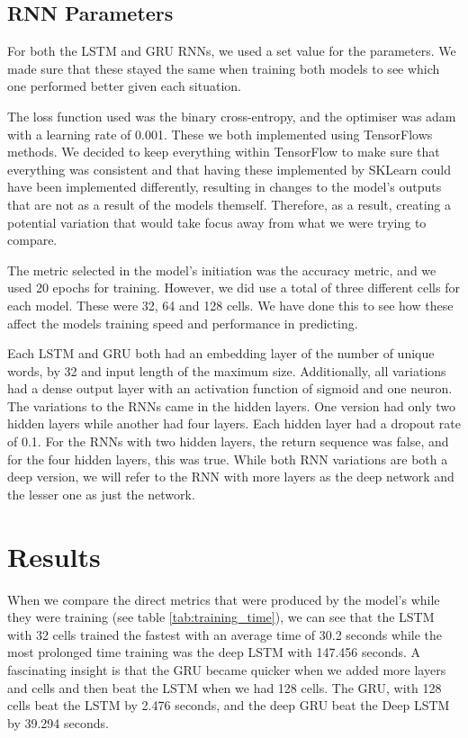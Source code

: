 \documentclass[a4paper,10pt]{article}
\begin{document}
	

\subsection{RNN Parameters}
	For both the LSTM and GRU RNNs, we used a set value for the parameters. We made sure that these stayed the same when training both models to see which one performed better given each situation. 
	
	The loss function used was the binary cross-entropy, and the optimiser was adam with a learning rate of 0.001. These we both implemented using TensorFlows methods. We decided to keep everything within TensorFlow to make sure that everything was consistent and that having these implemented by SKLearn could have been implemented differently, resulting in changes to the model's outputs that are not as a result of the models themself. Therefore, as a result, creating a potential variation that would take focus away from what we were trying to compare.
	
	The metric selected in the model's initiation was the accuracy metric, and we used 20 epochs for training. However, we did use a total of three different cells for each model. These were 32, 64 and 128 cells. We have done this to see how these affect the models training speed and performance in predicting.  
	
	Each LSTM and GRU both had an embedding layer of the number of unique words, by 32 and input length of the maximum size. Additionally, all variations had a dense output layer with an activation function of sigmoid and one neuron. The variations to the RNNs came in the hidden layers. One version had only two hidden layers while another had four layers. Each hidden layer had a dropout rate of 0.1. For the RNNs with two hidden layers, the return sequence was false, and for the four hidden layers, this was true. While both RNN variations are both a deep version, we will refer to the RNN with more layers as the deep network and the lesser one as just the network.
	

\section{Results}

	When we compare the direct metrics that were produced by the model's while they were training (see table \ref{tab:training_time}), we can see that the LSTM with 32 cells trained the fastest with an average time of 30.2 seconds while the most prolonged time training was the deep LSTM with 147.456 seconds. A fascinating insight is that the GRU became quicker when we added more layers and cells and then beat the LSTM when we had 128 cells. The GRU, with 128 cells beat the LSTM by 2.476 seconds, and the deep GRU beat the Deep LSTM by 39.294 seconds.
\end{document}
